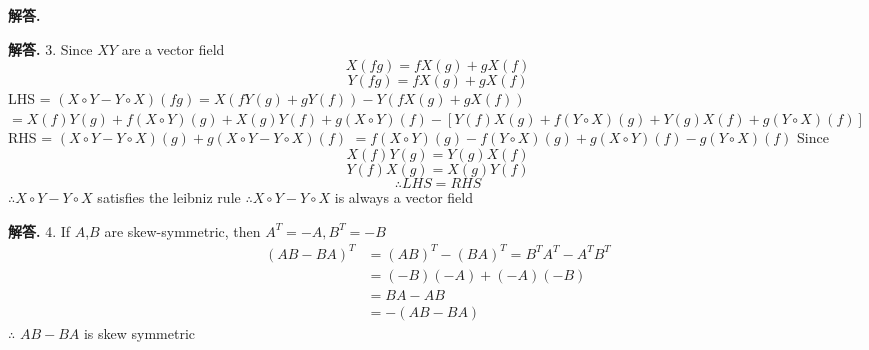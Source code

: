 \documentclass[12pt, a4paper, oneside]{article}
\newenvironment{solution}{\par\noindent\textbf{解答. }}{\par}
\begin{document}
\begin{CJK}{UTF8}{gbsn}
\begin{solution}
\end{solution}

\begin{solution}
  3. \newline
  Since $XY$ are a vector field
  $$X(fg) = fX(g)+gX(f)$$
  $$Y(fg) = fX(g)+gX(f)$$
  LHS = $(X\circ Y - Y\circ X)(fg) = X(fY(g) + gY(f)) - Y(fX(g) +gX(f))$ \newline
  $ = X(f)Y(g) + f(X\circ Y)(g) + X(g)Y(f) + g(X\circ Y)(f) - \left[Y(f)X(g)+f(Y\circ X)(g)+Y(g)X(f) + g(Y\circ X)(f)\right]$ \newline
  RHS = $(X\circ Y - Y\circ X)(g) + g(X\circ Y - Y\circ X)(f)$  \newline
  $ = f(X\circ Y)(g) - f(Y\circ X)(g) + g(X\circ Y)(f) - g(Y\circ X)(f)$ \newline
  Since 
  $$ X(f)Y(g) = Y(g)X(f)$$
  $$ Y(f)X(g) = X(g)Y(f)$$
  $$ \therefore LHS = RHS$$
  $\therefore X\circ Y - Y\circ X$ satisfies the leibniz rule \newline
  $\therefore X\circ Y - Y\circ X$ is always a vector field \newline
\end{solution}

\begin{solution}
  4.\newline
  If $A$,$B$ are skew-symmetric, then $A^T=-A, B^T=-B$
  \begin{align}
    (AB-BA)^T &= (AB)^T -(BA)^T = B^TA^T-A^TB^T \nonumber\\
    & =(-B)(-A) + (-A)(-B) \nonumber\\
    & =BA - AB \nonumber\\
    & =-(AB - BA) \nonumber
  \end{align}
  $\therefore$ $AB-BA$ is skew symmetric
\end{solution}


\end{CJK}
\end{document}
